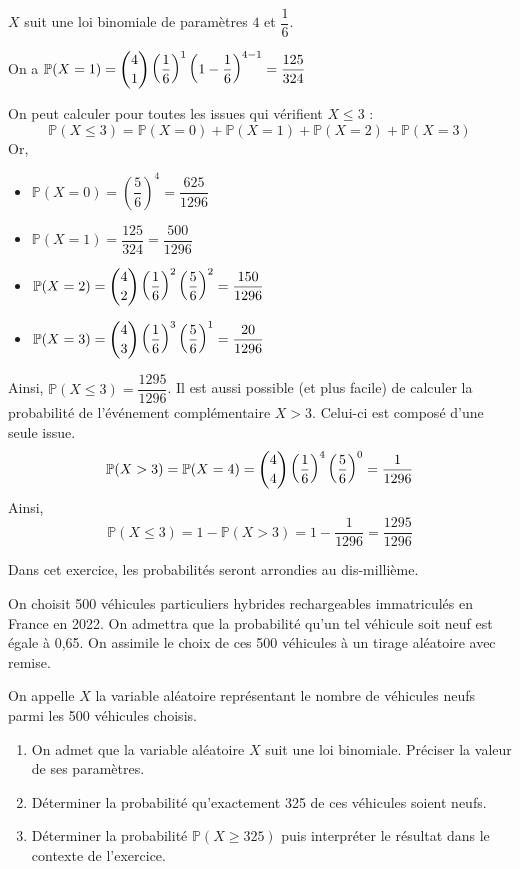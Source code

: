 \documentclass[11pt,fleqn, openany]{book} %
\begin{document}
\begin{solution}$X$ suit une loi binomiale de paramètres $4$ et $\dfrac{1}{6}$. 

On a $\mathbb{P}(X=1)=\dbinom{4}{1} \left(\dfrac{1}{6}\right)^1 \left(1-\dfrac{1}{6}\right)^{4-1}=\dfrac{125}{324}$

On peut calculer pour toutes les issues qui vérifient $X\leqslant3$ : 
\[\mathbb{P}(X \leqslant 3) = \mathbb{P}(X=0)+\mathbb{P}(X=1)+\mathbb{P}(X=2)+\mathbb{P}(X=3)\] 
Or,
\begin{itemize}
\item $\mathbb{P}(X=0)=\left(\dfrac{5}{6}\right)^4=\dfrac{625}{1296}$
\item $\mathbb{P}(X=1)=\dfrac{125}{324}=\dfrac{500}{1296}$
\item $\mathbb{P}(X=2)= \dbinom{4}{2} \left(\dfrac{1}{6}\right)^2 \left(\dfrac{5}{6}\right)^2= \dfrac{150}{1296}$
\item $\mathbb{P}(X=3)= \dbinom{4}{3} \left(\dfrac{1}{6}\right)^3 \left(\dfrac{5}{6}\right)^1= \dfrac{20}{1296}$
\end{itemize}
Ainsi, $\mathbb{P}(X \leqslant 3)=\dfrac{1295}{1296}$. Il est aussi possible (et plus facile) de calculer la probabilité de l'événement complémentaire $X>3$. Celui-ci est composé d'une seule issue.
\[ \mathbb{P}(X>3)=\mathbb{P}(X=4)= \dbinom{4}{4} \left( \dfrac{1}{6}\right)^4 \left( \dfrac{5}{6}\right)^0=\dfrac{1}{1296}\]
Ainsi, 
\[ \mathbb{P}(X\leqslant 3)=1- \mathbb{P}(X>3)=1-\dfrac{1}{1296}=\dfrac{1295}{1296}\]\end{solution}


\begin{exercise}[subtitle={(Amérique du Nord 2024)}]Dans cet exercice, les probabilités seront arrondies au dis-millième.

On choisit 500 véhicules particuliers hybrides rechargeables immatriculés en France en 2022. On admettra que la probabilité qu'un tel véhicule soit neuf est égale à 0,65.
On assimile le choix de ces 500 véhicules à un tirage aléatoire avec remise.

On appelle $X$ la variable aléatoire représentant le nombre de véhicules neufs parmi les 500 véhicules choisis.
\begin{enumerate}
\item On admet que la variable aléatoire $X$ suit une loi binomiale. Préciser la valeur de ses paramètres.
\item Déterminer la probabilité qu'exactement 325 de ces véhicules soient neufs.
\item Déterminer la probabilité $\mathbb{P}(X \geqslant 325)$ puis interpréter le résultat dans le contexte de l'exercice.\end{enumerate}

\end{exercise}
\end{document}
